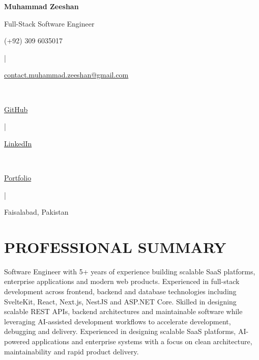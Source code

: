 \documentclass[letterpaper,11pt]{article}
\begin{document}
\begin{center}
\textbf{\Huge Muhammad Zeeshan}

\vspace{4pt}

{\large Full-Stack Software Engineer}

\vspace{6pt}

\small

\faPhone*
(+92) 309 6035017

\hspace{6pt}|\hspace{6pt}

\faEnvelope

\href{mailto:contact.muhammad.zeeshan@gmail.com}
{contact.muhammad.zeeshan@gmail.com}

\\

\faGithub

\href{https://github.com/zexhan17}
{GitHub}

\hspace{6pt}|\hspace{6pt}

\faLinkedin

\href{https://www.linkedin.com/in/muhammad-zeeshan-801448144/}
{LinkedIn}

\\

\faGlobe

\href{https://portfolio-nu-wine-q8a9w0y4g6.vercel.app/}
{Portfolio}

\hspace{6pt}|\hspace{6pt}

Faisalabad, Pakistan

\end{center}

\section{PROFESSIONAL SUMMARY}

\small{

Software Engineer with 5+ years of experience building scalable SaaS platforms, enterprise applications and modern web products. Experienced in full-stack development across frontend, backend and database technologies including SvelteKit, React, Next.js, NestJS and ASP.NET Core. Skilled in designing scalable REST APIs, backend architectures and maintainable software while leveraging AI-assisted development workflows to accelerate development, debugging and delivery. Experienced in designing scalable SaaS platforms, AI-powered applications and enterprise systems with a focus on clean architecture, maintainability and rapid product delivery.

}
\end{document}
